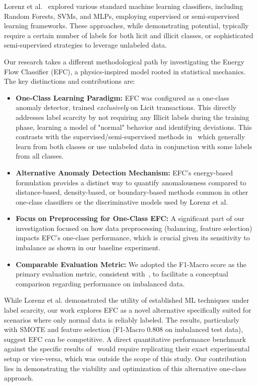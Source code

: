 \documentclass[12pt]{article}
\begin{document}
Lorenz et al.~\cite{lorenz2021machinelearningmethodsdetect} explored various standard machine learning classifiers, including
Random Forests, SVMs, and MLPs, employing supervised or semi-supervised learning frameworks. These approaches, while
demonstrating potential, typically require a certain number of labels for both licit and illicit classes, or sophisticated
semi-supervised strategies to leverage unlabeled data.

Our research takes a different methodological path by investigating the Energy Flow Classifier (EFC), a physics-inspired
model rooted in statistical mechanics. The key distinctions and contributions are:
\begin{itemize}
    \item \textbf{One-Class Learning Paradigm:} EFC was configured as a one-class anomaly detector, trained \textit{exclusively}
    on Licit transactions. This directly addresses label scarcity by not requiring any Illicit labels during the training phase,
    learning a model of "normal" behavior and identifying deviations. This contrasts with the supervised/semi-supervised
    methods in~\cite{lorenz2021machinelearningmethodsdetect} which generally learn from both classes or use unlabeled data
    in conjunction with some labels from all classes.
    \item \textbf{Alternative Anomaly Detection Mechanism:} EFC's energy-based formulation provides a distinct way to quantify
    anomalousness compared to distance-based, density-based, or boundary-based methods common in other one-class classifiers
    or the discriminative models used by Lorenz et al.
    \item \textbf{Focus on Preprocessing for One-Class EFC:} A significant part of our investigation focused on how data
    preprocessing (balancing, feature selection) impacts EFC's one-class performance, which is crucial given its sensitivity
    to imbalance as shown in our baseline experiment.
    \item \textbf{Comparable Evaluation Metric:} We adopted the F1-Macro score as the primary evaluation metric, consistent
    with~\cite{lorenz2021machinelearningmethodsdetect}, to facilitate a conceptual comparison regarding performance on imbalanced data.
\end{itemize}
While Lorenz et al. demonstrated the utility of established ML techniques under label scarcity, our work explores EFC as
a novel alternative specifically suited for scenarios where only normal data is reliably labeled. The results, particularly
with SMOTE and feature selection (F1-Macro 0.808 on imbalanced test data), suggest EFC can be competitive. A direct
quantitative performance benchmark against the specific results of~\cite{lorenz2021machinelearningmethodsdetect} would
require replicating their exact experimental setup or vice-versa, which was outside the scope of this study. Our contribution
lies in demonstrating the viability and optimization of this alternative one-class approach.
\end{document}
